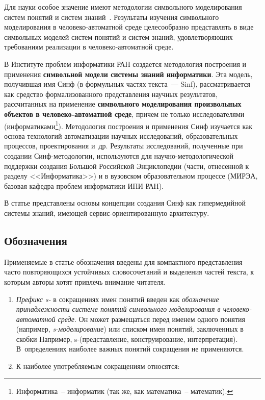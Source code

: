 \begin{multicols}{2}
Для науки особое значение имеют методологии символьного моделирования
сис\-тем понятий и систем знаний~\cite{1il}. Результаты изучения символьного
моделирования в человеко-автоматной среде целесообразно представлять в
виде символьных моделей систем понятий и систем знаний, удовлетворяющих
требованиям реализации в человеко-автоматной среде.

В Институте проблем информатики РАН создается методология построения и 
применения \textbf{символьной модели системы знаний информатики}. Эта модель, 
получившая имя Синф (в формульных час\-тях текста~--- Sinf), рассматривается 
как средство формализованного представления научных результатов, рассчитанных 
на применение \textbf{символьного моделирования произвольных объектов в 
человеко-автоматной среде}, причем не только исследователями 
(информатиками\footnote{Информатика~-- информатик (так же, как математика~-- 
математик).}). Методология построения и применения Синф изучается как основа 
технологий автоматизации научных исследований, образовательных процессов, 
проектирования и~др. Результаты исследований, полученные при создании 
Синф-методологии, используются для научно-методологической поддержки создания 
Большой Российской Энциклопедии (части, отнесенной к разделу <<Информатика>>) и 
в вузовском образовательном процессе (МИРЭА, базовая кафедра проблем 
информатики ИПИ РАН).

В статье представлены основы концепции создания Синф как гипермедийной системы 
знаний, имеющей сервис-ориентированную архитектуру. 
{

}

\subsection{Обозначения }

Применяемые в статье обозначения введены для компактного представления
часто по\-вто\-ря\-ющих\-ся устойчивых словосочетаний и выделения частей текста, к
которым авторы хотят привлечь внимание читателя.
\begin{enumerate}[1.]
\item \textit{Префикс s-}  в сокращениях имен понятий введен как
\textit{обозначение принадлежности сис\-те\-ме понятий символьного
моделирования в че\-ло\-ве\-ко-ав\-то\-мат\-ной среде}. Он может размещаться 
перед именем одного понятия (например, \textit{s-мо\-де\-ли\-ро\-ва\-ние}) или 
списком имен понятий, заключенных в скобки Например, s-(пред\-став\-ле\-ние, 
конструирование, интерпретация). В~определениях наиболее важных понятий 
сокращения не применяются.
\item К наиболее употребляемым сокращениям относятся:


\end{enumerate}
\end{multicols}
